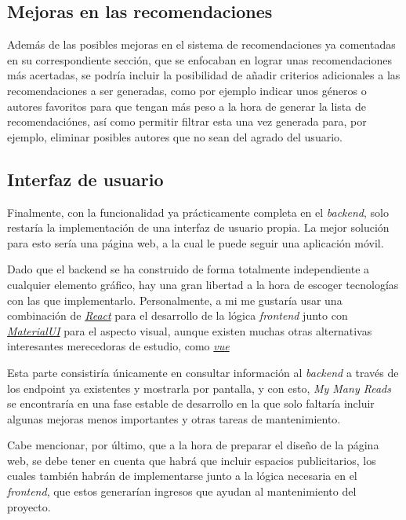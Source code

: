 \subsection{Mejoras en las recomendaciones}

Además de las posibles mejoras en el sistema de recomendaciones ya comentadas en su correspondiente sección, que se enfocaban en lograr unas recomendaciones más acertadas, se podría incluir la posibilidad de añadir criterios adicionales a las recomendaciones a ser generadas, como por ejemplo indicar unos géneros o autores favoritos para que tengan más peso a la hora de generar la lista de recomendaciónes, así como permitir filtrar esta una vez generada para, por ejemplo, eliminar posibles autores que no sean del agrado del usuario.

\subsection{Interfaz de usuario}

Finalmente, con la funcionalidad ya prácticamente completa en el \textit{backend}, solo restaría la implementación de una interfaz de usuario propia. La mejor solución para esto sería una página web, a la cual le puede seguir una aplicación móvil.

Dado que el backend se ha construido de forma totalmente independiente a cualquier elemento gráfico, hay una gran libertad a la hora de escoger tecnologías con las que implementarlo. Personalmente, a mi me gustaría usar una combinación de \href{https://es.react.dev/}{\textit{React}} para el desarrollo de la lógica \textit{frontend} junto con \href{https://mui.com/}{\textit{MaterialUI}} para el aspecto visual, aunque existen muchas otras alternativas interesantes merecedoras de estudio, como \href{https://vuejs.org/}{\textit{vue}}

Esta parte consistiría únicamente en consultar información al \textit{backend} a través de los endpoint ya existentes y mostrarla por pantalla, y con esto, \textit{My Many Reads} se encontraría en una fase estable de desarrollo en la que solo faltaría incluir algunas mejoras menos importantes y otras tareas de mantenimiento.

Cabe mencionar, por último, que a la hora de preparar el diseño de la página web, se debe tener en cuenta que habrá que incluir espacios publicitarios, los cuales también habrán de implementarse junto a la lógica necesaria en el \textit{frontend}, que estos generarían ingresos que ayudan al mantenimiento del proyecto.